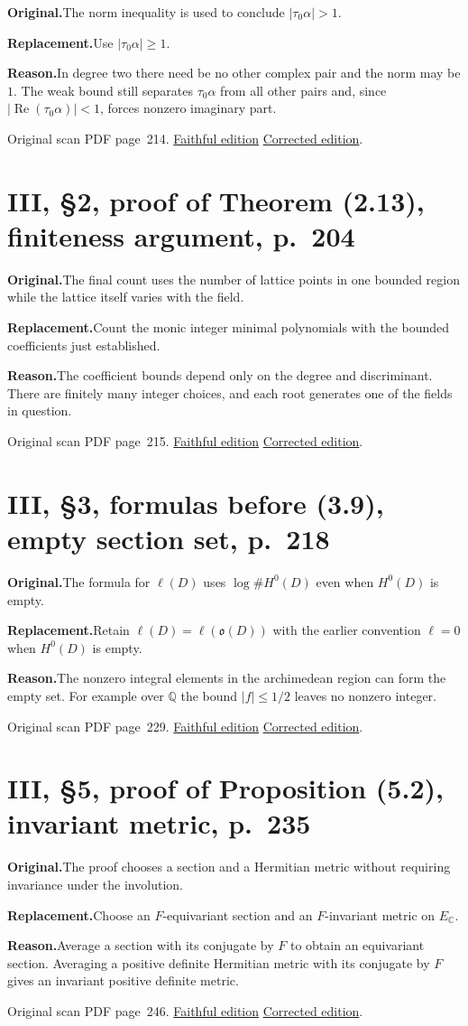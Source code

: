 \documentclass[11pt,a4paper]{article}
\newcommand{\original}{\par\smallskip\noindent\textbf{Original.}\enspace}
\newcommand{\replacement}{\par\smallskip\noindent\textbf{Replacement.}\enspace}
\newcommand{\reason}{\par\smallskip\noindent\textbf{Reason.}\enspace}
\newcommand{\editionlink}[3]{\href{#1\#errata.#2}{#3}}
\newcommand{\location}[2]{%
  \par\smallskip\noindent Original scan PDF page~#2.\enspace
  \editionlink{Neukirch_Faithful.pdf}{#1}{Faithful edition}
  \quad\editionlink{Neukirch_Corrected.pdf}{#1}{Corrected edition}.}
\begin{document}
\original The norm inequality is used to conclude $|\tau_0\alpha|>1$.
\replacement Use $|\tau_0\alpha|\ge1$.
\reason In degree two there need be no other complex pair and the norm may be $1$. The weak bound still separates $\tau_0\alpha$ from all other pairs and, since $|\operatorname{Re}(\tau_0\alpha)|<1$, forces nonzero imaginary part.
\location{92}{214}

\setcounter{section}{92}
\section{III, \S2, proof of Theorem (2.13), finiteness argument, p.~204}\label{errata:item:93}

\original The final count uses the number of lattice points in one bounded region while the lattice itself varies with the field.
\replacement Count the monic integer minimal polynomials with the bounded coefficients just established.
\reason The coefficient bounds depend only on the degree and discriminant. There are finitely many integer choices, and each root generates one of the fields in question.
\location{93}{215}

\setcounter{section}{93}
\section{III, \S3, formulas before (3.9), empty section set, p.~218}\label{errata:item:94}

\original The formula for $\ell(D)$ uses $\log\#H^0(D)$ even when $H^0(D)$ is empty.
\replacement Retain $\ell(D)=\ell(\mathfrak o(D))$ with the earlier convention $\ell=0$ when $H^0(D)$ is empty.
\reason The nonzero integral elements in the archimedean region can form the empty set. For example over $\mathbb Q$ the bound $|f|\le1/2$ leaves no nonzero integer.
\location{94}{229}

\setcounter{section}{94}
\section{III, \S5, proof of Proposition (5.2), invariant metric, p.~235}\label{errata:item:95}

\original The proof chooses a section and a Hermitian metric without requiring invariance under the involution.
\replacement Choose an $F$-equivariant section and an $F$-invariant metric on $E_{\mathbb C}$.
\reason Average a section with its conjugate by $F$ to obtain an equivariant section. Averaging a positive definite Hermitian metric with its conjugate by $F$ gives an invariant positive definite metric.
\location{95}{246}
\end{document}
